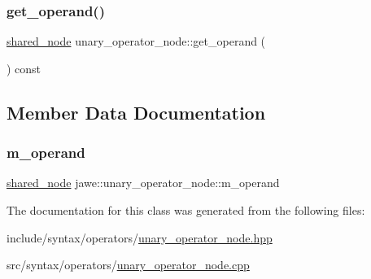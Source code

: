 \subsubsection{\texorpdfstring{get\+\_\+operand()}{get\_operand()}}
{\footnotesize\ttfamily \hyperlink{namespacejawe_a3f307481d921b6cbb50cc8511fc2b544}{shared\+\_\+node} unary\+\_\+operator\+\_\+node\+::get\+\_\+operand (\begin{DoxyParamCaption}{ }\end{DoxyParamCaption}) const}



\subsection{Member Data Documentation}
\mbox{\label{classjawe_1_1unary__operator__node_a693dc1355d40a4a4a2a2efd523e02732}} 
\subsubsection{\texorpdfstring{m\+\_\+operand}{m\_operand}}
{\footnotesize\ttfamily \hyperlink{namespacejawe_a3f307481d921b6cbb50cc8511fc2b544}{shared\+\_\+node} jawe\+::unary\+\_\+operator\+\_\+node\+::m\+\_\+operand\hspace{0.3cm}{\ttfamily [private]}}



The documentation for this class was generated from the following files\+:\begin{DoxyCompactItemize}
\item 
include/syntax/operators/\hyperlink{unary__operator__node_8hpp}{unary\+\_\+operator\+\_\+node.\+hpp}\item 
src/syntax/operators/\hyperlink{unary__operator__node_8cpp}{unary\+\_\+operator\+\_\+node.\+cpp}\end{DoxyCompactItemize}
